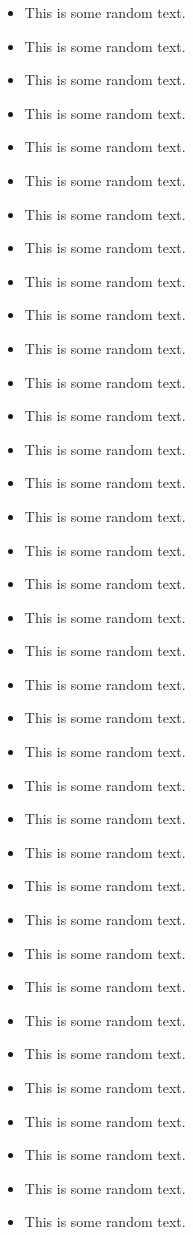 \begin{itemize}
	\item This is some random text.
	\item This is some random text.
	\item This is some random text.
	\item This is some random text.
	\item This is some random text.
	\item This is some random text.
	\item This is some random text.
	\item This is some random text.
	\item This is some random text.
	\item This is some random text.
	\item This is some random text.
	\item This is some random text.
	\item This is some random text.
		\item This is some random text.
	\item This is some random text.
	\item This is some random text.
	\item This is some random text.
	\item This is some random text.
	\item This is some random text.
	\item This is some random text.
	\item This is some random text.
	\item This is some random text.
	\item This is some random text.
	\item This is some random text.
	\item This is some random text.
	\item This is some random text.
	\item This is some random text.
	\item This is some random text.
	\item This is some random text.
	\item This is some random text.
	\item This is some random text.
	\item This is some random text.
	\item This is some random text.
	\item This is some random text.
	\item This is some random text.
	\item This is some random text.
	\item This is some random text.
\end{itemize}
